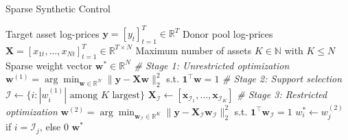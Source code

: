 \begin{algorithm}[H]
\caption{Sparse Synthetic Control}
\label{alg:synthetic_control}
\begin{algorithmic}[1]
\Require 
    \State Target asset log-prices $\mathbf{y} = [y_t]_{t=1}^T \in \mathbb{R}^T$
    \State Donor pool log-prices $\mathbf{X} = [x_{1t}, ..., x_{Nt}]_{t=1}^T \in \mathbb{R}^{T \times N}$
    \State Maximum number of assets $K \in \mathbb{N}$ with $K \leq N$
\mx 
\Ensure Sparse weight vector $\mathbf{w}^* \in \mathbb{R}^N$
\mx %
{}
    \State \textit{\# Stage 1: Unrestricted optimization}
    \State $\mathbf{w}^{(1)} = \arg\min_{\mathbf{w}\in\mathbb{R}^N} \|\mathbf{y} - \mathbf{X}\mathbf{w}\|_2^2$ s.t. $\mathbf{1}^\top \mathbf{w}=1$
    \Comment{\scalebox{0.9}{\textcolor{Grey_color}{Solve full least squares problem}}} 
\mx %
    \State \textit{\# Stage 2: Support selection}
    \State $\mathcal{I} \gets \{i : |w_i^{(1)}| \text{ among } K \text{ largest}\}$
\Comment{\scalebox{0.9}{\textcolor{Grey_color}{Select $K$ largest weights}}} 
	\State $\mathbf{X}_{\mathcal{I}} \gets [\mathbf{x}_{\mathcal{I}_1}, \ldots, \mathbf{x}_{\mathcal{I}_K}]$ \Comment{\scalebox{0.9}{\textcolor{Grey_color}{Restricted donor matrix}}}
\mx %
    \State \textit{\# Stage 3: Restricted optimization} 	
    \State $\mathbf{w}^{(2)} = \arg\min_{\mathbf{w}_{\mathcal{I}}\in\mathbb{R}^K} \|\mathbf{y} - \mathbf{X}_{\mathcal{I}}\mathbf{w}_{\mathcal{I}}\|_2^2$ s.t. $\mathbf{1}^\top \mathbf{w}_{\mathcal{I}}=1$ 
\Comment{\scalebox{0.9}{\textcolor{Grey_color}{Solve restricted program}}}
    \State $w_i^* \gets w_j^{(2)}$ if $i = \mathcal{I}_j$, else $0$
\Comment{\scalebox{0.9}{\textcolor{Grey_color}{Construct full weights}}}
    \EndFor
\mx
    \State \Return $\mathbf{w}^*$
\EndFunction
\end{algorithmic}
\end{algorithm}


